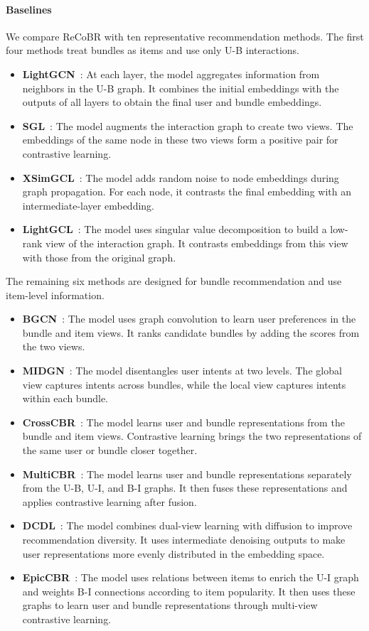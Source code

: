 \documentclass[letterpaper,journal]{IEEEtran}
\begin{document}
\paragraph{Baselines}
We compare ReCoBR with ten representative recommendation
methods. The first four methods treat bundles as items and use only
U-B interactions.
\begin{itemize}
\item \textbf{LightGCN}~\cite{he2020lightgcn}: At each layer, the model aggregates information from neighbors in the U-B graph.
It combines the initial embeddings with the outputs of all layers to obtain the final user and bundle embeddings.
\item \textbf{SGL}~\cite{wu2021sgl}: The model augments the interaction graph to create two views.
The embeddings of the same node in these two views form a positive pair for contrastive learning.
\item \textbf{XSimGCL}~\cite{yu2024xsimgcl}: The model adds random noise to node embeddings during graph propagation.
For each node, it contrasts the final embedding with an intermediate-layer embedding.
\item \textbf{LightGCL}~\cite{cai2023lightgcl}: The model uses singular value decomposition to build a low-rank view of the interaction graph.
It contrasts embeddings from this view with those from the original graph.
\end{itemize}
The remaining six methods are designed for bundle recommendation and use item-level information.
\begin{itemize}
\item \textbf{BGCN}~\cite{chang2020bgcn}: The model uses graph convolution to learn user preferences in the bundle and item views.
It ranks candidate bundles by adding the scores from the two views.
\item \textbf{MIDGN}~\cite{zhao2022midgn}: The model disentangles user intents at two levels.
The global view captures intents across bundles, while the local view captures intents within each bundle.
\item \textbf{CrossCBR}~\cite{ma2022crosscbr}: The model learns user and bundle representations from the bundle and item views.
Contrastive learning brings the two representations of the same user or bundle closer together.
\item \textbf{MultiCBR}~\cite{ma2024multicbr}: The model learns user and bundle representations separately from the U-B, U-I, and B-I graphs.
It then fuses these representations and applies contrastive learning after fusion.
\item \textbf{DCDL}~\cite{chen2025dcdl}: The model combines dual-view learning with diffusion to improve recommendation diversity.
It uses intermediate denoising outputs to make user representations more evenly distributed in the embedding space.
\item \textbf{EpicCBR}~\cite{li2026epiccbr}: The model uses relations between items to enrich the U-I graph and weights B-I connections according to item popularity.
It then uses these graphs to learn user and bundle representations through multi-view contrastive learning.
\end{itemize}
\end{document}
